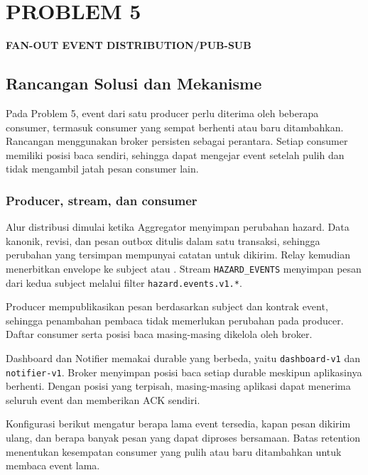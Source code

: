 \chapter{PROBLEM 5}
\begin{center}\large\bfseries FAN-OUT EVENT DISTRIBUTION/PUB-SUB\end{center}

\section{Rancangan Solusi dan Mekanisme}
Pada Problem 5, event dari satu producer perlu diterima oleh beberapa consumer, termasuk consumer yang sempat berhenti atau baru ditambahkan. Rancangan menggunakan broker persisten sebagai perantara. Setiap consumer memiliki posisi baca sendiri, sehingga dapat mengejar event setelah pulih dan tidak mengambil jatah pesan consumer lain.

\subsection{Producer, stream, dan consumer}
Alur distribusi dimulai ketika Aggregator menyimpan perubahan hazard. Data kanonik, revisi, dan pesan outbox ditulis dalam satu transaksi, sehingga perubahan yang tersimpan mempunyai catatan untuk dikirim. Relay kemudian menerbitkan envelope ke subject  atau . Stream \texttt{HAZARD\_EVENTS} menyimpan pesan dari kedua subject melalui filter \texttt{hazard.events.v1.*}.

Producer mempublikasikan pesan berdasarkan subject dan kontrak event, sehingga penambahan pembaca tidak memerlukan perubahan pada producer. Daftar consumer serta posisi baca masing-masing dikelola oleh broker.

Dashboard dan Notifier memakai durable yang berbeda, yaitu \texttt{dashboard-v1} dan \texttt{notifier-v1}. Broker menyimpan posisi baca setiap durable meskipun aplikasinya berhenti. Dengan posisi yang terpisah, masing-masing aplikasi dapat menerima seluruh event dan memberikan ACK sendiri.

Konfigurasi berikut mengatur berapa lama event tersedia, kapan pesan dikirim ulang, dan berapa banyak pesan yang dapat diproses bersamaan. Batas retention menentukan kesempatan consumer yang pulih atau baru ditambahkan untuk membaca event lama.

